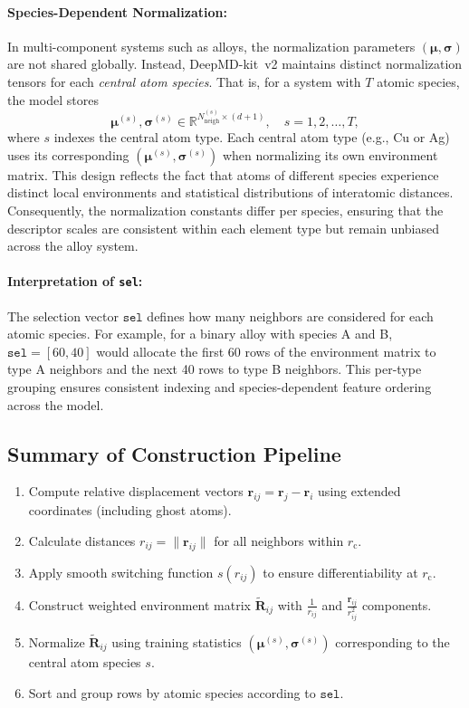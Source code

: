 \documentclass[12pt,a4paper]{article}
\begin{document}
\paragraph{Species-Dependent Normalization:}
In multi-component systems such as alloys, the normalization parameters $(\boldsymbol{\mu}, \boldsymbol{\sigma})$ are not shared globally.  
Instead, DeepMD-kit~v2 maintains distinct normalization tensors for each \textit{central atom species}.  
That is, for a system with $T$ atomic species, the model stores
\[
\boldsymbol{\mu}^{(s)}, \boldsymbol{\sigma}^{(s)} \in \mathbb{R}^{N_{\mathrm{neigh}}^{(s)} \times (d+1)}, \quad s = 1, 2, \dots, T,
\]
where $s$ indexes the central atom type.  
Each central atom type (e.g., Cu or Ag) uses its corresponding $(\boldsymbol{\mu}^{(s)}, \boldsymbol{\sigma}^{(s)})$ when normalizing its own environment matrix.  
This design reflects the fact that atoms of different species experience distinct local environments and statistical distributions of interatomic distances.  
Consequently, the normalization constants differ per species, ensuring that the descriptor scales are consistent within each element type but remain unbiased across the alloy system.

\paragraph{Interpretation of \texttt{sel}:}
The selection vector $\texttt{sel}$ defines how many neighbors are considered for each atomic species.  
For example, for a binary alloy with species A and B, $\texttt{sel} = [60, 40]$ would allocate the first 60 rows of the environment matrix to type A neighbors and the next 40 rows to type B neighbors.  
This per-type grouping ensures consistent indexing and species-dependent feature ordering across the model.

\subsection*{Summary of Construction Pipeline}

\begin{enumerate}
  \item Compute relative displacement vectors $\mathbf{r}_{ij} = \mathbf{r}_j - \mathbf{r}_i$ using extended coordinates (including ghost atoms).
  \item Calculate distances $r_{ij} = \|\mathbf{r}_{ij}\|$ for all neighbors within $r_{\mathrm{c}}$.
  \item Apply smooth switching function $s(r_{ij})$ to ensure differentiability at $r_{\mathrm{c}}$.
  \item Construct weighted environment matrix $\tilde{\mathbf{R}}_{ij}$ with $\frac{1}{r_{ij}}$ and $\frac{\mathbf{r}_{ij}}{r_{ij}^2}$ components.
  \item Normalize $\tilde{\mathbf{R}}_{ij}$ using training statistics $(\boldsymbol{\mu}^{(s)}, \boldsymbol{\sigma}^{(s)})$ corresponding to the central atom species $s$.
  \item Sort and group rows by atomic species according to $\texttt{sel}$.
\end{enumerate}
\end{document}
